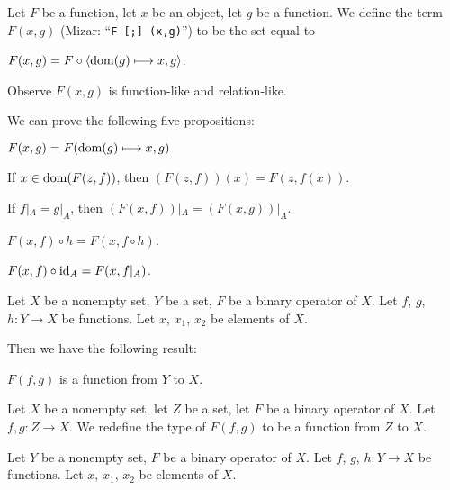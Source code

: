 \documentclass{article}
\begin{document}
\begin{definition}
Let $F$ be a function, let $x$ be an object, let $g$ be a function.
We define the term $F(x,g)$ (Mizar: ``\verb#F [;] (x,g)#'') to be the set equal to
\begin{defn}
\item\label{funcop1:def5}%
$F(x,g)=F\circ\langle\operatorname{dom}(g)\longmapsto x,g\rangle$.
\end{defn}
\end{definition}

Observe $F(x,g)$ is function-like and relation-like.

We can prove the following five propositions:
\begin{thm}
\item\label{funcop1:31} $F(x,g)=F(\operatorname{dom}(g)\longmapsto x,g)$
\item\label{funcop1:32} If $x\in\operatorname{dom}(F(z,f))$, then $(F(z,f))(x)=F(z,f(x))$.
\item\label{funcop1:33} If $f|_{A}=g|_{A}$,
  then $(F(x,f))|_{A}=(F(x,g))|_{A}$.
\item\label{funcop1:34} $F(x,f)\circ h=F(x,f\circ h)$.
\item\label{funcop1:35} $F(x,f)\circ\operatorname{id}_{A}=F(x,f|_{A})$.
\end{thm}

Let $X$ be a nonempty set, $Y$ be a set, $F$ be a binary operator of $X$.
Let $f$, $g$, $h\colon Y\to X$ be functions. Let $x$, $x_{1}$, $x_{2}$
be elements of $X$.

Then we have the following result:
\begin{thm}
\item\label{funcop1:36} $F(f,g)$ is a function from $Y$ to $X$.
\end{thm}

\begin{definition}
Let $X$ be a nonempty set, let $Z$ be a set, let $F$ be a binary
operator of $X$. Let $f,g\colon Z\to X$.
We redefine the type of $F(f,g)$ to be a function from $Z$ to $X$.
\end{definition}

Let $Y$ be a nonempty set, $F$ be a binary operator of $X$.
Let $f$, $g$, $h\colon Y\to X$ be functions. Let $x$, $x_{1}$, $x_{2}$
be elements of $X$.
\end{document}
